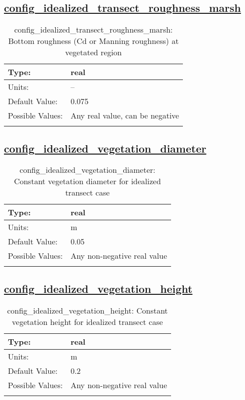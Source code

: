 \subsection[config\_idealized\_transect\_roughness\_marsh]{\hyperref[sec:nm_tab_tidal_boundary]{config\_idealized\_transect\_roughness\_marsh}}
\label{subsec:nm_sec_config_idealized_transect_roughness_marsh}
\begin{center}
\begin{longtable}{| p{2.0in} || p{4.0in} |}
    \hline
    Type: & real \\
    \hline
    Units: & -- \\
    \hline
    Default Value: & 0.075 \\
    \hline
    Possible Values: & Any real value, can be negative \\
    \hline
    \caption{config\_idealized\_transect\_roughness\_marsh: Bottom roughness (Cd or Manning roughness) at vegetated region}
\end{longtable}
\end{center}
\subsection[config\_idealized\_vegetation\_diameter]{\hyperref[sec:nm_tab_tidal_boundary]{config\_idealized\_vegetation\_diameter}}
\label{subsec:nm_sec_config_idealized_vegetation_diameter}
\begin{center}
\begin{longtable}{| p{2.0in} || p{4.0in} |}
    \hline
    Type: & real \\
    \hline
    Units: & \si{m} \\
    \hline
    Default Value: & 0.05 \\
    \hline
    Possible Values: & Any non-negative real value \\
    \hline
    \caption{config\_idealized\_vegetation\_diameter: Constant vegetation diameter for idealized transect case}
\end{longtable}
\end{center}
\subsection[config\_idealized\_vegetation\_height]{\hyperref[sec:nm_tab_tidal_boundary]{config\_idealized\_vegetation\_height}}
\label{subsec:nm_sec_config_idealized_vegetation_height}
\begin{center}
\begin{longtable}{| p{2.0in} || p{4.0in} |}
    \hline
    Type: & real \\
    \hline
    Units: & \si{m} \\
    \hline
    Default Value: & 0.2 \\
    \hline
    Possible Values: & Any non-negative real value  \\
    \hline
    \caption{config\_idealized\_vegetation\_height: Constant vegetation height for idealized transect case}
\end{longtable}
\end{center}
